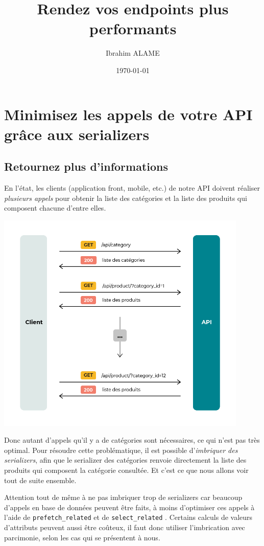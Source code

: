 \documentclass[a4paper]{article}
\title{Rendez vos endpoints plus performants}
\author{Ibrahim ALAME}
\date{\today}
\begin{document}
 
\maketitle
\section{Minimisez les appels de votre API grâce aux serializers}
\subsection{Retournez plus d'informations}
En l’état, les clients (application front, mobile, etc.) de notre API doivent réaliser {\em plusieurs appels} pour obtenir la liste des catégories et la liste des produits qui composent chacune d’entre elles.
\begin{center}
\includegraphics[width=12cm]{images/image11.png}
\end{center}
Donc autant d’appels qu’il y a de catégories sont nécessaires, ce qui n’est pas très optimal. Pour résoudre cette problématique, il est possible d’{\em imbriquer des serializers}, afin que le serializer des catégories renvoie directement la liste des produits qui composent la catégorie consultée. Et c’est ce que nous allons voir tout de suite ensemble.
\begin{theorem}
Attention tout de même à ne pas imbriquer trop de serializers car beaucoup d’appels en base de données peuvent être faits, à moins d’optimiser ces appels à l’aide de {\tt prefetch\_related}  et de {\tt select\_related} . Certains calculs de valeurs d’attributs peuvent aussi être coûteux, il faut donc utiliser l’imbrication avec parcimonie, selon les cas qui se présentent à nous.
\end{theorem}
\end{document}
